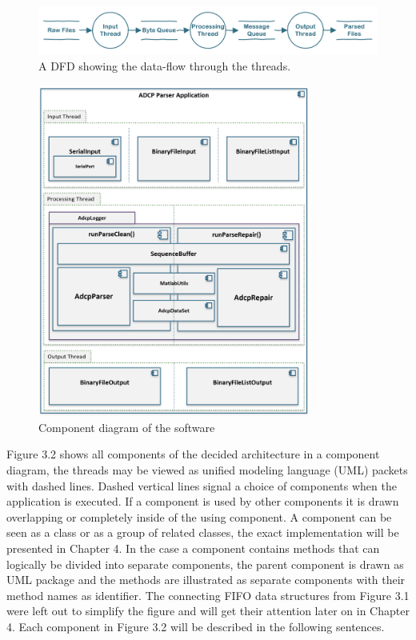 \begin{figure}[ht]
\centering
      \includegraphics[width=1\textwidth]{dfd}
        \caption{A DFD showing the data-flow through the threads.}
\end{figure}

\begin{figure}[ht]
\centering
      \includegraphics[width=0.8\textwidth]{all_components}
        \caption{Component diagram of the software}
\end{figure}

Figure 3.2 shows all components of the decided architecture in a component diagram, the threads may be viewed as unified modeling language (UML) packets with dashed lines. Dashed vertical lines signal a choice of components when the application is executed. If a component is used by other components it is drawn overlapping or completely inside of the using component. A component can be seen as a class or as a group of related classes, the exact implementation will be presented in Chapter 4. In the case a component contains methods that can logically be divided into separate components, the parent component is drawn as UML package and the methods are illustrated as separate components with their method names as identifier. The connecting FIFO data structures from Figure 3.1 were left out to simplify the figure and will get their attention later on in Chapter 4. Each component in Figure 3.2 will be described in the following sentences. 
\vspace{3em}

